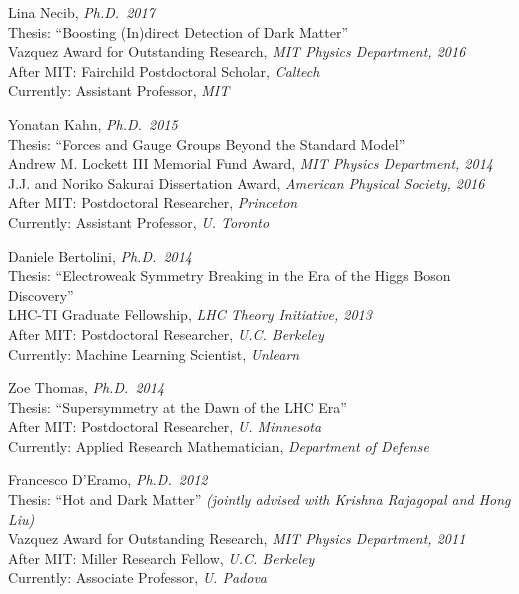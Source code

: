 \item Lina Necib, \emph{Ph.D.~2017}
\\ Thesis: ``Boosting (In)direct Detection of Dark Matter''
\\ Vazquez Award for Outstanding Research, \emph{MIT Physics Department, 2016}
\\ After MIT: Fairchild Postdoctoral Scholar, \emph{Caltech}
\\ Currently: Assistant Professor, \emph{MIT}

\item Yonatan Kahn, \emph{Ph.D.~2015}
\\ Thesis: ``Forces and Gauge Groups Beyond the Standard Model''
\\ Andrew M. Lockett III Memorial Fund Award, \emph{MIT Physics Department, 2014}
\\ J.J. and Noriko Sakurai Dissertation Award, \emph{American Physical Society, 2016}
\\ After MIT: Postdoctoral Researcher, \emph{Princeton}
\\ Currently: Assistant Professor, \emph{U. Toronto}

\item Daniele Bertolini, \emph{Ph.D.~2014}
\\ Thesis: ``Electroweak Symmetry Breaking in the Era of the Higgs Boson Discovery''
\\ LHC-TI Graduate Fellowship, \emph{LHC Theory Initiative, 2013}
\\ After MIT: Postdoctoral Researcher, \emph{U.C. Berkeley}
\\ Currently: Machine Learning Scientist, \emph{Unlearn}

\item Zoe Thomas, \emph{Ph.D.~2014}
\\ Thesis: ``Supersymmetry at the Dawn of the LHC Era''
\\ After MIT: Postdoctoral Researcher, \emph{U. Minnesota}
\\ Currently: Applied Research Mathematician, \emph{Department of Defense}

\item Francesco D'Eramo, \emph{Ph.D.~2012}
\\ Thesis: ``Hot and Dark Matter'' \emph{(jointly advised with Krishna Rajagopal and Hong Liu)}
\\ Vazquez Award for Outstanding Research, \emph{MIT Physics Department, 2011}
\\ After MIT: Miller Research Fellow, \emph{U.C. Berkeley}
\\ Currently: Associate Professor, \emph{U. Padova}

\el

